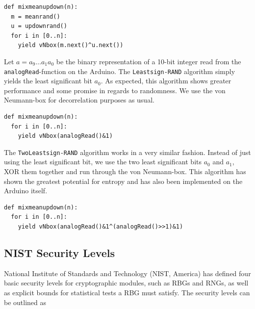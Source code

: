 \documentclass[a4paper]{article}           %
\begin{document}
\begin{lstlisting}[caption=The \texttt{MixMeanUpdown-RAND} algorithm]
def mixmeanupdown(n):
  m = meanrand()
  u = updownrand()
  for i in [0..n]:
    yield vNbox(m.next()^u.next())
\end{lstlisting}

Let $a = a_9 \ldots a_1a_0$ be the binary representation of a 10-bit integer read from the \texttt{analogRead}-function on the Arduino. The \texttt{Leastsign-RAND} algorithm simply yields the least significant bit $a_0$. As expected, this algorithm shows greater performance and some promise in regards to randomness. We use the von Neumann-box for decorrelation purposes as usual. 

\begin{lstlisting}[caption=The \texttt{Leastsign-RAND} algorithm]
def mixmeanupdown(n):
  for i in [0..n]:
    yield vNbox(analogRead()&1)
\end{lstlisting}

The \texttt{TwoLeastsign-RAND} algorithm works in a very similar fashion. Instead of just using the least significant bit, we use the two least significant bits $a_0$ and $a_1$, XOR them together and run through the von Neumann-box. This algorithm has shown the greatest potential for entropy and has also been implemented on the Arduino itself.

\begin{lstlisting}[caption=The \texttt{Leastsign-RAND} algorithm]
def mixmeanupdown(n):
  for i in [0..n]:
    yield vNbox(analogRead()&1^(analogRead()>>1)&1)
\end{lstlisting}



\subsection{NIST Security Levels}

National Institute of Standards and Technology (NIST, America) has defined\cite{fips140} four basic security levels for cryptographic modules, such as RBGs and RNGs, as well as explicit bounds for statistical tests a RBG must satisfy. The security levels can be outlined as
\end{document}
